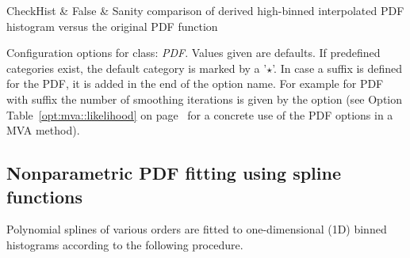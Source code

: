 \begin{option}[tp]
\begin{optiontableLong2}
CheckHist         & False        & Sanity comparison of derived high-binned interpolated PDF histogram 
                                   versus the original PDF function
\end{optiontableLong2}
\caption[.]{\optionCaptionSize 
     Configuration options for class: {\em PDF}. Values given are defaults. If predefined 
     categories exist, the default category is marked by a '$\star$'. In case a suffix is defined 
     for the PDF, it is added in the end of the option name. For example for PDF 
     with suffix  the number of smoothing iterations is given by the 
     option 
     (see Option Table~\ref{opt:mva::likelihood} on page~\pageref{opt:mva::likelihood} for a concrete
     use of the PDF options in a MVA method).     
}
\label{opt:pdf}
\end{option}

\subsection{Nonparametric PDF fitting using spline functions
                }

Polynomial splines of various orders are fitted to one-dimensional (1D) binned histograms 
according to the following procedure.

